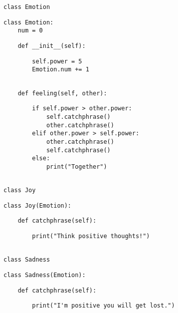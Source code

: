 \begin{blocksection}
\begin{lstlisting}
class Emotion
\end{lstlisting}
\begin{solution}[.5in]
\begin{lstlisting}
class Emotion:
    num = 0
\end{lstlisting}
\end{solution}
\begin{lstlisting}
    def __init__(self):
\end{lstlisting}
\begin{solution}[.80in]
\begin{lstlisting}
        self.power = 5
        Emotion.num += 1
\end{lstlisting}
\end{solution}
\begin{lstlisting}

    def feeling(self, other):
\end{lstlisting}
\begin{solution}[2.3in]
\begin{lstlisting}
        if self.power > other.power:
            self.catchphrase()
            other.catchphrase()
        elif other.power > self.power:
            other.catchphrase()
            self.catchphrase()
        else:
            print("Together")
\end{lstlisting}
\end{solution}
\begin{lstlisting}

class Joy
\end{lstlisting}
\begin{solution}[0in]
\begin{lstlisting}
class Joy(Emotion):
\end{lstlisting}
\end{solution}
\begin{lstlisting}
    def catchphrase(self):
\end{lstlisting}
\begin{solution}[0.55in]
\begin{lstlisting}
        print("Think positive thoughts!")
\end{lstlisting}
\end{solution}
\begin{lstlisting}

class Sadness
\end{lstlisting}
\begin{solution}[0in]
\begin{lstlisting}
class Sadness(Emotion):
\end{lstlisting}
\end{solution}
\begin{lstlisting}
    def catchphrase(self):
\end{lstlisting}
\begin{solution}[0.55in]
\begin{lstlisting}
        print("I'm positive you will get lost.")
\end{lstlisting}
\end{solution}
\end{blocksection}
